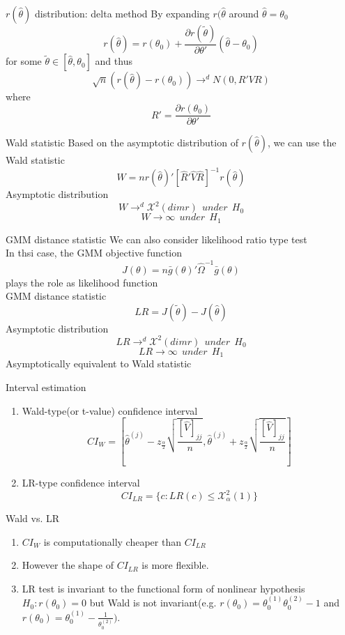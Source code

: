 \documentclass{beamer}
\begin{document}
\begin{frame}{$r(\hat{\theta})$ distribution: delta method}
	By expanding $r(\hat{\theta}$ around $\hat{\theta} = \theta_0$
		\[r(\hat{\theta}) = r(\theta_0) + \frac{\partial r(\tilde{\theta})}{\partial \theta'} (\hat{\theta} - \theta_0)\]
		for some $\tilde{\theta} \in [\hat{\theta},\theta_0]$ and thus
		\[\sqrt{n}(r(\hat{\theta}) - r(\theta_0)) \rightarrow^d N(0,R'VR)\]
		where
		\[R' = \frac{\partial r(\theta_0)}{\partial \theta'}\]
\end{frame}
\begin{frame}{Wald statistic}
	Based on the asymptotic distribution of $r(\hat{\theta})$, we can use the Wald statistic 
	\[W = nr(\hat{\theta})'[\hat{R}'\hat{V} \hat{R}]^{-1} r(\hat{\theta})\]
	Asymptotic distribution
	\[W \rightarrow^d \mathcal{X}^2(dim r) \ \ under \ \ H_0\]
	\[W \rightarrow \infty \ \ under \ \ H_1\]
\end{frame}
\begin{frame}{GMM distance statistic}
	We can also consider likelihood ratio type test \\
	In thsi case, the GMM objective function
	\[J(\theta) = n\bar{g}(\theta)' \hat{\Omega}^{-1} \bar{g}(\theta)\]
	plays the role as likelihood function \\
	GMM distance statistic
	\[LR = J(\tilde{\theta}) - J(\hat{\theta})\]
	Asymptotic distribution
	\[LR \rightarrow^d \mathcal{X}^2(dim r) \ \ under \ \ H_0 \]
	\[LR \rightarrow \infty \ \ under \ \ H_1 \]
	Asymptotically equivalent to Wald statistic
\end{frame}
\begin{frame}{Interval estimation}
	\begin{enumerate}
		\item Wald-type(or t-value) confidence interval
			\[CI_W = [\hat{\theta}^{(j)} - z_{\frac{\alpha}{2}} \sqrt{\frac{[\hat{V}]_{jj}}{n}}, \hat{\theta}^{(j)} +z_{\frac{\alpha}{2}} \sqrt{\frac{[\hat{V}]_{jj}}{n}}]\]
			\item LR-type confidence interval
				\[CI_{LR} = \{c: LR(c) \leq \mathcal{X}^2_{\alpha}(1)\}\]
	\end{enumerate}
\end{frame}
\begin{frame}{Wald vs. LR}
	\begin{enumerate}
		\item $CI_W$ is computationally cheaper than $CI_{LR}$
		\item However the shape of $CI_{LR}$ is more flexible.
		\item LR test is invariant to the functional form of nonlinear hypothesis $H_0:r(\theta_0) =0$ but Wald is not invariant(e.g. $r(\theta_0) = \theta^{(1)}_0 \theta^{(2)}_0 - 1$ and $r(\theta_0) = \theta^{(1)}_0 - \frac{1} {\theta^{(2)}_0})$.
	\end{enumerate}
\end{frame}
\end{document}
